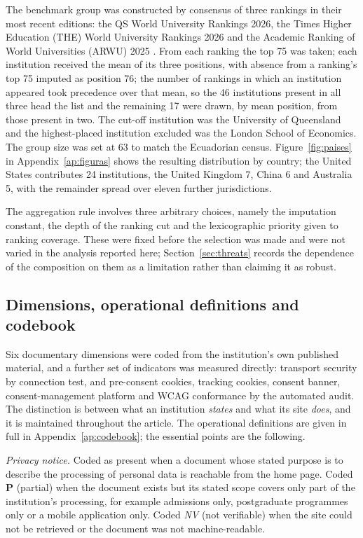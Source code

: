 \documentclass[pdflatex,sn-basic,Numbered,iicol]{sn-jnl}
\newcommand{\nv}{\textsl{\footnotesize NV}}
\theoremstyle{thmstyleone}
\theoremstyle{thmstyletwo}
\theoremstyle{thmstylethree}
\begin{document}
The benchmark group was constructed by consensus of three rankings in their most recent editions: the QS World University Rankings 2026, the Times Higher Education (THE) World University Rankings 2026 and the Academic Ranking of World Universities (ARWU) 2025 \citep{qs2026,the2026,arwu2025}. From each ranking the top 75 was taken; each institution received the mean of its three positions, with absence from a ranking's top 75 imputed as position 76; the number of rankings in which an institution appeared took precedence over that mean, so the 46 institutions present in all three head the list and the remaining 17 were drawn, by mean position, from those present in two. The cut-off institution was the University of Queensland and the highest-placed institution excluded was the London School of Economics. The group size was set at 63 to match the Ecuadorian census. Figure~\ref{fig:paises} in Appendix~\ref{ap:figuras} shows the resulting distribution by country; the United States contributes 24 institutions, the United Kingdom 7, China 6 and Australia 5, with the remainder spread over eleven further jurisdictions.

The aggregation rule involves three arbitrary choices, namely the imputation constant, the depth of the ranking cut and the lexicographic priority given to ranking coverage. These were fixed before the selection was made and were not varied in the analysis reported here; Section~\ref{sec:threats} records the dependence of the composition on them as a limitation rather than claiming it as robust.

\subsection{Dimensions, operational definitions and codebook}\label{sec:methods-codebook}

Six documentary dimensions were coded from the institution's own published material, and a further set of indicators was measured directly: transport security by connection test, and pre-consent cookies, tracking cookies, consent banner, consent-management platform and WCAG conformance by the automated audit. The distinction is between what an institution \emph{states} and what its site \emph{does}, and it is maintained throughout the article. The operational definitions are given in full in Appendix~\ref{ap:codebook}; the essential points are the following.

\emph{Privacy notice.} Coded as present when a document whose stated purpose is to describe the processing of personal data is reachable from the home page. Coded \textbf{P} (partial) when the document exists but its stated scope covers only part of the institution's processing, for example admissions only, postgraduate programmes only or a mobile application only. Coded \nv{} (not verifiable) when the site could not be retrieved or the document was not machine-readable.
\end{document}
